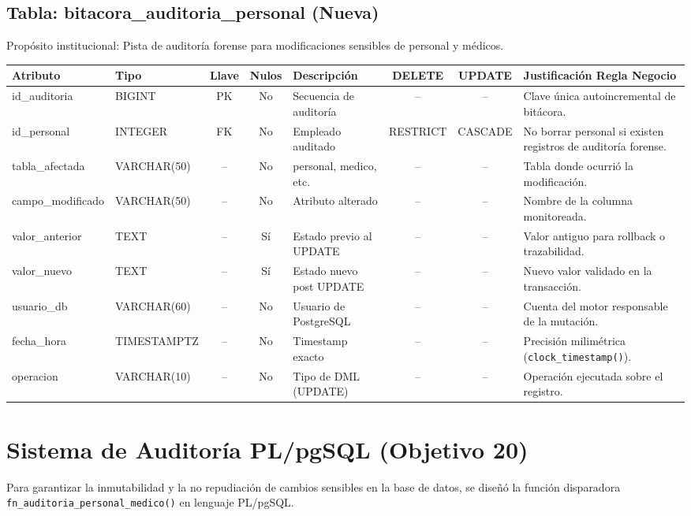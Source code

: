 \documentclass[11pt,a4paper]{article}
\begin{document}
\subsection{Tabla: bitacora\_auditoria\_personal (Nueva)}
Propósito institucional: Pista de auditoría forense para modificaciones sensibles de personal y médicos.
\begin{table}[H]
\centering
\scriptsize
\begin{tabularx}{\linewidth}{|l|l|c|c|X|c|c|X|}
\hline
\textbf{Atributo} & \textbf{Tipo} & \textbf{Llave} & \textbf{Nulos} & \textbf{Descripción} & \textbf{DELETE} & \textbf{UPDATE} & \textbf{Justificación Regla Negocio} \\
\hline
id\_auditoria & BIGINT & PK & No & Secuencia de auditoría & -- & -- & Clave única autoincremental de bitácora. \\
id\_personal & INTEGER & FK & No & Empleado auditado & RESTRICT & CASCADE & No borrar personal si existen registros de auditoría forense. \\
tabla\_afectada & VARCHAR(50) & -- & No & personal, medico, etc. & -- & -- & Tabla donde ocurrió la modificación. \\
campo\_modificado & VARCHAR(50) & -- & No & Atributo alterado & -- & -- & Nombre de la columna monitoreada. \\
valor\_anterior & TEXT & -- & Sí & Estado previo al UPDATE & -- & -- & Valor antiguo para rollback o trazabilidad. \\
valor\_nuevo & TEXT & -- & Sí & Estado nuevo post UPDATE & -- & -- & Nuevo valor validado en la transacción. \\
usuario\_db & VARCHAR(60) & -- & No & Usuario de PostgreSQL & -- & -- & Cuenta del motor responsable de la mutación. \\
fecha\_hora & TIMESTAMPTZ & -- & No & Timestamp exacto & -- & -- & Precisión milimétrica (\texttt{clock\_timestamp()}). \\
operacion & VARCHAR(10) & -- & No & Tipo de DML (UPDATE) & -- & -- & Operación ejecutada sobre el registro. \\
\hline
\end{tabularx}
\end{table}

\newpage

\section{Sistema de Auditoría PL/pgSQL (Objetivo 20)}
Para garantizar la inmutabilidad y la no repudiación de cambios sensibles en la base de datos, se diseñó la función disparadora \texttt{fn\_auditoria\_personal\_medico()} en lenguaje PL/pgSQL.
\end{document}
